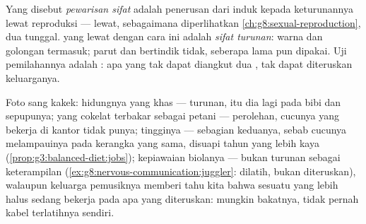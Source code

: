 \begin{definition}\label{def:g9:heredity-and-traits:heredity}
Yang disebut \emph{pewarisan sifat}
adalah penerusan  dari induk kepada keturunannya lewat
reproduksi --- lewat, sebagaimana diperlihatkan
\cref{ch:g8:sexual-reproduction}, dua  tunggal. 
yang lewat dengan cara ini adalah \emph{sifat
turunan}: warna  dan golongan 
termasuk; parut dan  bertindik tidak, seberapa lama
pun dipakai. Uji pemilahannya adalah : apa yang tak
dapat diangkut dua , tak dapat diteruskan keluarganya.
\end{definition}

\begin{example}\label{ex:g9:heredity-and-traits:album}
Foto sang kakek: hidungnya yang khas --- turunan, itu dia
lagi pada bibi dan sepupunya;  yang cokelat terbakar
sebagai petani --- perolehan, cucunya yang bekerja di kantor
tidak punya; tingginya --- sebagian keduanya, sebab cucunya
melampauinya pada kerangka yang sama, disuapi tahun yang
lebih kaya (\cref{prop:g3:balanced-diet:jobs}); kepiawaian
biolanya --- bukan turunan sebagai keterampilan
(\cref{ex:g8:nervous-communication:juggler}: 
dilatih, bukan diteruskan), walaupun keluarga pemusiknya
memberi tahu kita bahwa sesuatu yang lebih halus sedang
bekerja pada apa yang diteruskan: mungkin bakatnya, tidak
pernah kabel terlatihnya sendiri.
\end{example}

